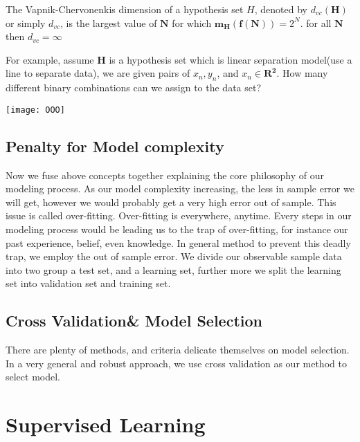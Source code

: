 \begin{defn}
The Vapnik-Chervonenkis dimension of a hypothesis set $\mathbf{}{H}$, denoted by $d_{vc}(\mathbf{H})$ or simply $d_{vc}$, is the largest value of $\mathbf{N}$ for which $\mathbf{m_{\mathbf{H}}}(\mathbf{f(N)})= 2^{N}$. for all $\mathbf{N}$ then $d_{vc}=\infty$

\end{defn}
%
For example, assume $\mathbf{H}$ is a hypothesis set which is linear separation model(use a line to separate data), we are given pairs of ${x_{n}, y_{n}} $, and $ x_{n} \in \mathbf{R^2}$. How many different binary combinations can we assign to the data set?

\begin{center}
{
\texttt{[image: OOO]}
}
\end{center}

\subsection*{Penalty for Model complexity}
Now we fuse above concepts together explaining the core philosophy of our modeling process.
As our model complexity increasing, the less in sample error we will get, however we would probably get a very high error out of sample. This issue is called over-fitting. Over-fitting is everywhere, anytime.  Every steps in our modeling process would be leading us to the trap of over-fitting, for instance our past experience, belief, even knowledge.
In general method to prevent this deadly trap, we employ the out of sample error. We divide our observable sample data into two group a test set, and a learning set, further more we split the learning set into validation set and training set. 

\subsection*{Cross Validation\& Model Selection}
There are plenty of methods, and criteria delicate themselves on model selection. In a very general and robust approach, we use cross validation as our method to select model.

\section{Supervised Learning}

